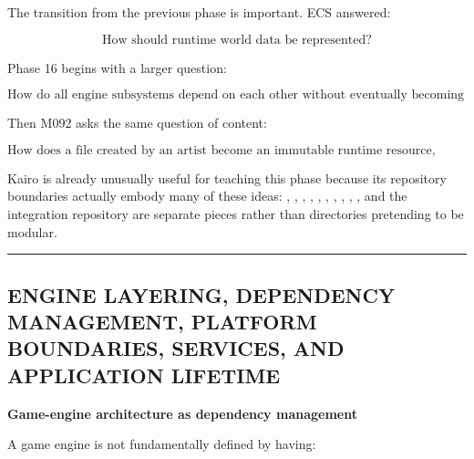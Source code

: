 \hypertarget{05-engine-i-ch010-engine-architecture-dependency-direction-runtime-boundaries-platformbackend-abstraction-asset-identity-import-pipelines-dependency-graphs-ddc-hot-reload-streaming-residency-and-gpu-safe-lifetime}{}

The transition from the previous phase is important. ECS answered:

\[
\text{How should runtime world data be represented?}
\]

Phase 16 begins with a larger question:

\[
\boxed{
\text{How do all engine subsystems depend on each other without eventually becoming one inseparable program?}
}
\]

Then M092 asks the same question of content:

\[
\boxed{
\text{How does a file created by an artist become an immutable runtime resource,
while remaining reproducible, reloadable, cacheable and safe for the GPU?}
}
\]

Kairo is already unusually useful for teaching this phase because its repository boundaries actually embody many of these ideas: , , , , , , , , , , and the  integration repository are separate pieces rather than directories pretending to be modular.

\begin{center}\rule{0.5\linewidth}{0.5pt}\end{center}

\subsection{ENGINE LAYERING, DEPENDENCY MANAGEMENT, PLATFORM BOUNDARIES, SERVICES, AND APPLICATION LIFETIME}\label{05-engine-i-ch010-engine-layering-dependency-management-platform-boundaries-services-and-application-lifetime}

\hypertarget{05-engine-i-ch010-engine-layering-dependency-management-platform-boundaries-services-and-application-lifetime}{}

\textbf{Game-engine architecture as dependency management}

A game engine is not fundamentally defined by having:

